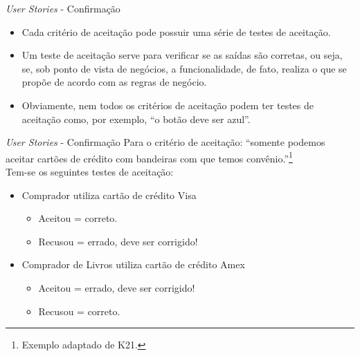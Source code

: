 \documentclass[11pt]{beamer}
\begin{document}
   \begin{frame}{\textit{User Stories} - Confirmação}
      \begin{itemize}
         \item Cada critério de aceitação pode possuir uma série de testes de aceitação.
         \item Um teste de aceitação serve para verificar se as saídas são corretas, ou seja, se, sob ponto de vista de negócios, a funcionalidade, de fato, realiza o que se propõe de acordo com as regras de negócio.
         \item Obviamente, nem todos os critérios de aceitação podem ter testes de aceitação como, por exemplo, ``o botão deve ser azul''.
      \end{itemize}
   \end{frame}

   \begin{frame}{\textit{User Stories} - Confirmação}
      Para o critério de aceitação: ``somente podemos aceitar cartões de crédito com bandeiras com que temos convênio.''\footnote{Exemplo adaptado de K21.}\\
      Tem-se os seguintes testes de aceitação:
      \begin{itemize}
         \item Comprador utiliza cartão de crédito Visa
           \begin{itemize}
              \item Aceitou = correto.
              \item Recusou = errado, deve ser corrigido!
           \end{itemize}
         \item Comprador de Livros utiliza cartão de crédito Amex
           \begin{itemize}
              \item Aceitou = errado, deve ser corrigido!
              \item Recusou = correto.
           \end{itemize}
      \end{itemize}
   \end{frame}
\end{document}
